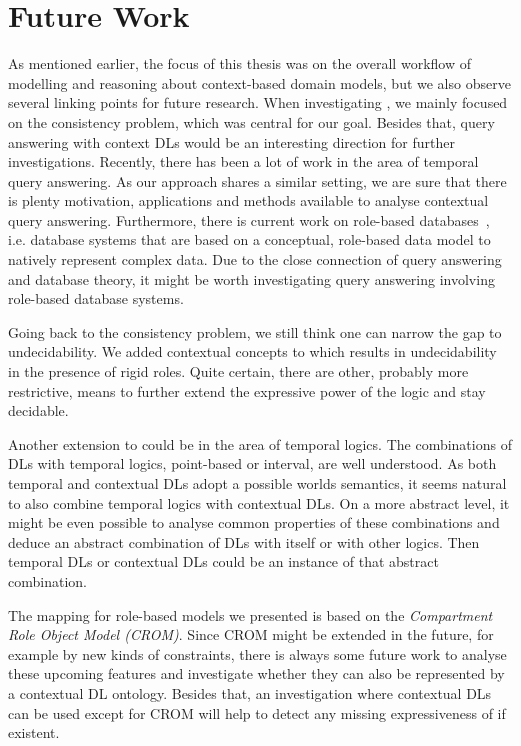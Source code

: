 \section{Future Work}
\label{sec:future-work}

As mentioned earlier, the focus of this thesis was on the overall workflow of modelling and
reasoning about context-based domain models, but we also observe several linking points for future
research. When investigating \LMLO, we mainly focused on the consistency problem, which was central
for our goal. Besides that, query answering with context DLs would be an interesting direction for
further investigations. Recently, there has been a lot of work in the area of temporal query
answering. As our approach shares a similar setting, we are sure that there is plenty motivation,
applications and methods available to analyse contextual query answering. Furthermore, there is
current work on role-based databases~\cite{JaKV-ADBIS16}, i.e. database systems that are based on a
conceptual, role-based data model to natively represent complex data. Due to the close connection of
query answering and database theory, it might be worth investigating query answering involving
role-based database systems.

Going back to the consistency problem, we still think one can narrow the gap to undecidability. We
added contextual concepts to \LMLO which results in undecidability in the presence of rigid
roles. Quite certain, there are other, probably more restrictive, means to further extend the
expressive power of the logic and stay decidable.

Another extension to \LMLO could be in the area of temporal logics. The combinations of DLs with
temporal logics, point-based or interval, are well understood. As both temporal and contextual DLs
adopt a possible worlds semantics, it seems natural to also combine temporal logics with contextual
DLs. On a more abstract level, it might be even possible to analyse common properties of these
combinations and deduce an abstract combination of DLs with itself or with other logics. Then
temporal DLs or contextual DLs could be an instance of that abstract combination.

The mapping for role-based models we presented is based on the \emph{Compartment Role Object Model
  (CROM)}. Since CROM might be extended in the future, for example by new kinds of constraints,
there is always some future work to analyse these upcoming features and investigate whether they can
also be represented by a contextual DL ontology.  Besides that, an investigation where contextual
DLs can be used except for CROM will help to detect any missing expressiveness of \LMLO if existent.

